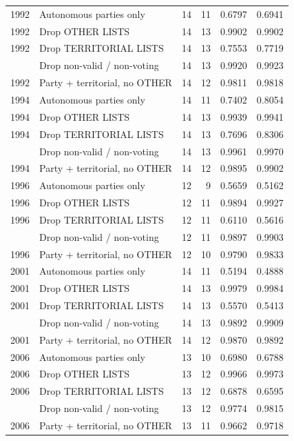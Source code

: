 \begin{longtable}[t]{rlrrrr}
1992 & Autonomous parties only & 14 & 11 & 0.6797 & 0.6941\\
1992 & Drop OTHER LISTS & 14 & 13 & 0.9902 & 0.9902\\
1992 & Drop TERRITORIAL LISTS & 14 & 13 & 0.7553 & 0.7719\\
\addlinespace
1992 & Drop non-valid / non-voting & 14 & 13 & 0.9920 & 0.9923\\
1992 & Party + territorial, no OTHER & 14 & 12 & 0.9811 & 0.9818\\
1994 & Autonomous parties only & 14 & 11 & 0.7402 & 0.8054\\
1994 & Drop OTHER LISTS & 14 & 13 & 0.9939 & 0.9941\\
1994 & Drop TERRITORIAL LISTS & 14 & 13 & 0.7696 & 0.8306\\
\addlinespace
1994 & Drop non-valid / non-voting & 14 & 13 & 0.9961 & 0.9970\\
1994 & Party + territorial, no OTHER & 14 & 12 & 0.9895 & 0.9902\\
1996 & Autonomous parties only & 12 & 9 & 0.5659 & 0.5162\\
1996 & Drop OTHER LISTS & 12 & 11 & 0.9894 & 0.9927\\
1996 & Drop TERRITORIAL LISTS & 12 & 11 & 0.6110 & 0.5616\\
\addlinespace
1996 & Drop non-valid / non-voting & 12 & 11 & 0.9897 & 0.9903\\
1996 & Party + territorial, no OTHER & 12 & 10 & 0.9790 & 0.9833\\
2001 & Autonomous parties only & 14 & 11 & 0.5194 & 0.4888\\
2001 & Drop OTHER LISTS & 14 & 13 & 0.9979 & 0.9984\\
2001 & Drop TERRITORIAL LISTS & 14 & 13 & 0.5570 & 0.5413\\
\addlinespace
2001 & Drop non-valid / non-voting & 14 & 13 & 0.9892 & 0.9909\\
2001 & Party + territorial, no OTHER & 14 & 12 & 0.9870 & 0.9892\\
2006 & Autonomous parties only & 13 & 10 & 0.6980 & 0.6788\\
2006 & Drop OTHER LISTS & 13 & 12 & 0.9966 & 0.9973\\
2006 & Drop TERRITORIAL LISTS & 13 & 12 & 0.6878 & 0.6595\\
\addlinespace
2006 & Drop non-valid / non-voting & 13 & 12 & 0.9774 & 0.9815\\
2006 & Party + territorial, no OTHER & 13 & 11 & 0.9662 & 0.9718\\

\end{longtable}
